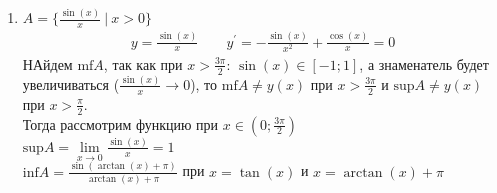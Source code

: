 \begin{enumerate}
		\item $A = \{\frac{\sin(x)}{x}\ |\ x>0 \}$\\
			\begin{gather*}
				y = \frac{\sin(x)}{x} \qquad y^{\prime} = - \frac{\sin(x)}{x^2} + \frac{\cos(x)}{x} = 0
			\end{gather*}
			НАйдем $\text{mf} A $, так как при $x > \frac{3\pi}{2}$: $\sin(x) \in [ - 1; 1]$, а знаменатель будет увеличиваться ($\frac{\sin(x)}{x} \to 0$), то $\text{mf} A \ne y(x)$ при $x > \frac{3\pi}{2}$ и $\text{sup} A \ne y(x)$ при $x > \frac{\pi}{2}$.\\
			Тогда рассмотрим функцию при $x \in (0; \frac{3\pi}{2})$\\
			$\text{sup} A = \lim \limits_{x \to 0} \frac{\sin(x)}{x} = 1$\\
			$\text{inf} A = \frac{\sin(\arctan(x) + \pi)}{\arctan(x) + \pi}$ при $x = \tan(x)$ и $x = \arctan(x) + \pi$
		\end{enumerate}
		


